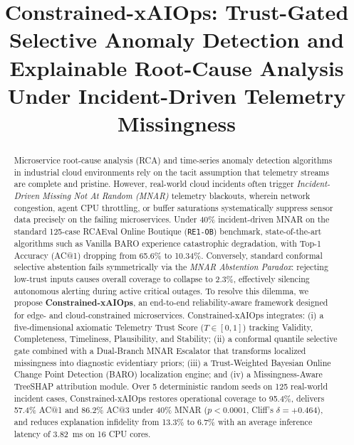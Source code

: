 \documentclass[conference]{IEEEtran}
\begin{document}
\title{Constrained-xAIOps: Trust-Gated Selective Anomaly Detection and Explainable Root-Cause Analysis Under Incident-Driven Telemetry Missingness}

\author{
}

\maketitle

\begin{abstract}
Microservice root-cause analysis (RCA) and time-series anomaly detection algorithms in industrial cloud environments rely on the tacit assumption that telemetry streams are complete and pristine. However, real-world cloud incidents often trigger \emph{Incident-Driven Missing Not At Random (MNAR)} telemetry blackouts, wherein network congestion, agent CPU throttling, or buffer saturations systematically suppress sensor data precisely on the failing microservices. Under 40\% incident-driven MNAR on the standard 125-case RCAEval Online Boutique (\texttt{RE1-OB}) benchmark, state-of-the-art algorithms such as Vanilla BARO experience catastrophic degradation, with Top-1 Accuracy (AC@1) dropping from 65.6\% to 10.34\%. Conversely, standard conformal selective abstention fails symmetrically via the \emph{MNAR Abstention Paradox}: rejecting low-trust inputs causes overall coverage to collapse to 2.3\%, effectively silencing autonomous alerting during active critical outages.
To resolve this dilemma, we propose \textbf{Constrained-xAIOps}, an end-to-end reliability-aware framework designed for edge- and cloud-constrained microservices. Constrained-xAIOps integrates: (i) a five-dimensional axiomatic Telemetry Trust Score ($T \in [0, 1]$) tracking Validity, Completeness, Timeliness, Plausibility, and Stability; (ii) a conformal quantile selective gate combined with a Dual-Branch MNAR Escalator that transforms localized missingness into diagnostic evidentiary priors; (iii) a Trust-Weighted Bayesian Online Change Point Detection (BARO) localization engine; and (iv) a Missingness-Aware TreeSHAP attribution module. Over 5 deterministic random seeds on 125 real-world incident cases, Constrained-xAIOps restores operational coverage to 95.4\%, delivers 57.4\% AC@1 and 86.2\% AC@3 under 40\% MNAR ($p < 0.0001$, Cliff's $\delta = +0.464$), and reduces explanation infidelity from 13.3\% to 6.7\% with an average inference latency of 3.82~ms on 16 CPU cores.
\end{abstract}
\end{document}
